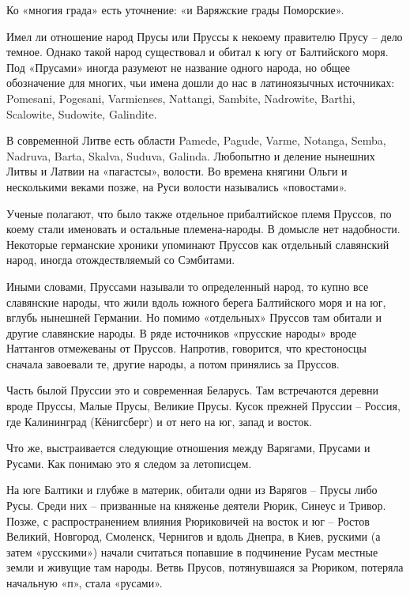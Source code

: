 Ко «многия града» есть уточнение: «и Варяжские грады Поморские».


Имел ли отношение народ Прусы или Пруссы к некоему правителю Прусу – дело темное. Однако такой народ существовал и обитал к югу от Балтийского моря. Под «Прусами» иногда разумеют не название одного народа, но общее обозначение для многих, чьи имена дошли до нас в латиноязычных источниках: Pomesani, Pogesani, Varmienses, Nattangi, Sambite, Nadrowite, Barthi, Scalowi\-te, Sudowite, Ga\-lindite.%

В современной Литве есть области Pamede, Pagude, Varme, Notanga, Semba, Nadruva, Barta, Skalva, Suduva, Galinda. Любопытно и деление нынешних Литвы и Латвии на «пагастсы», волости. Во времена княгини Ольги и несколькими веками позже, на Руси волости назывались «повостами».

Ученые полагают, что было также отдельное прибалтийское племя Пруссов, по коему стали именовать и остальные племена-народы. В домысле нет надобности. Некоторые германские хроники упоминают Пруссов как отдельный славянский народ, иногда отождествляемый со Сэмбитами.

Иными словами, Пруссами называли то определенный народ, то купно все славянские народы, что жили вдоль южного берега Балтийского моря и на юг, вглубь нынешней Германии. Но помимо «отдельных» Пруссов там обитали и другие славянские народы. В ряде источников «прусские народы» вроде Наттангов отмежеваны от Пруссов. Напротив, говорится, что крестоносцы сначала завоевали те, другие народы, а потом принялись за Пруссов.

Часть былой Пруссии это и современная Беларусь. Там встречаются деревни вроде Пруссы, Малые Прусы, Великие Прусы. Кусок прежней Пруссии – Россия, где Калининград (Кёнигсберг) и от него на юг, запад и восток.

Что же, выстраивается следующие отношения между Варягами, Прусами и Русами. Как понимаю это я следом за летописцем.

На юге Балтики и глубже в материк, обитали одни из Варягов – Прусы либо Русы. Среди них – призванные на княженье деятели Рюрик, Синеус и Тривор. Позже, с распространением влияния Рюриковичей на восток и юг – Ростов Великий, Новгород, Смоленск, Чернигов и вдоль Днепра, в Киев, рускими (а затем «русскими») начали считаться попавшие в подчинение Русам местные земли и живущие там народы. Ветвь Прусов, потянувшаяся за Рюриком, потеряла начальную «п», стала «русами».

